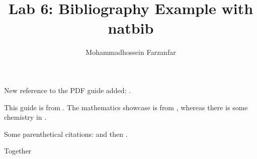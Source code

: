 \documentclass{article}
\author{Mohammadhossein Farzanfar}
\title{Lab 6: Bibliography Example with natbib}
\begin{document}
New reference to the PDF guide added: \citet{Kulyabov2023}.
\maketitle
This guide is from \citet{Kulyabov2023}. The mathematics showcase is from \citet{Graham1995}, whereas there is some chemistry in \citet{Thomas2008}.

Some parenthetical citations: \citep{Kulyabov2023} and then \citep[p.~56]{Thomas2008}.

\citep[See][pp.~45--48]{Graham1995}

Together \citep{Kulyabov2023,Graham1995,Thomas2008}



\end{document}
